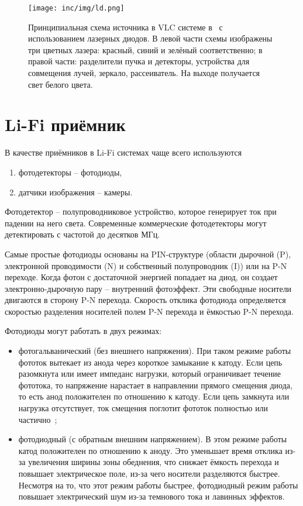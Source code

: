 \begin{figure}[!ht]
    \centering
    \texttt{[image: inc/img/ld.png]}
    \caption{Принципиальная схема источника в VLC системе в~\cite{Hussein2015} с использованием лазерных диодов. В левой части схемы изображены три цветных лазера: красный, синий и зелёный соответственно; в правой части: разделители пучка и детекторы, устройства для совмещения лучей, зеркало, рассеиватель. На выходе получается свет белого цвета.}
    \label{fig:ld}
\end{figure}

\section{Li-Fi приёмник}

В качестве приёмников в Li-Fi системах чаще всего используются

\begin{enumerate}
    \item фотодетекторы \--- фотодиоды,
    \item датчики изображения \--- камеры.
\end{enumerate}

Фотодетектор \--- полупроводниковое устройство, которое генерирует ток при падении на него света. Современные коммерческие фотодетекторы могут детектировать с частотой до десятков МГц. 

Самые простые фотодиоды основаны на PIN-структуре (области дырочной (P), электронной проводимости (N) и собственный полупроводник (I)) или на P-N переходе. Когда фотон с достаточной энергией попадает на диод, он создает электронно-дырочную пару \--- внутренний фотоэффект. Эти свободные носители двигаются в сторону P-N перехода. Скорость отклика фотодиода определяется скоростью разделения носителей полем P-N перехода и ёмкостью P-N перехода. 

Фотодиоды могут работать в двух режимах:

\begin{itemize}
    \item фотогальванический (без внешнего напряжения). При таком режиме работы фототок вытекает из анода через короткое замыкание к катоду. Если цепь разомкнута или имеет импеданс нагрузки, который ограничивает течение фототока, то напряжение нарастает в направлении прямого смещения диода, то есть анод положителен по отношению к катоду. Если цепь замкнута или нагрузка отсутствует, ток смещения поглотит фототок полностью или частично~\cite{Haberlin_2014};
    \item фотодиодный (с обратным внешним напряжением). В этом режиме работы катод положителен по отношению к аноду. Это уменьшает время отклика из-за увеличения ширины зоны обеднения, что снижает ёмкость перехода и повышает электрическое поле, из-за чего носители разделяются быстрее. Несмотря на то, что этот режим работы быстрее, фотодиодный режим работы повышает электрический шум из-за темнового тока и лавинных эффектов.
\end{itemize}

